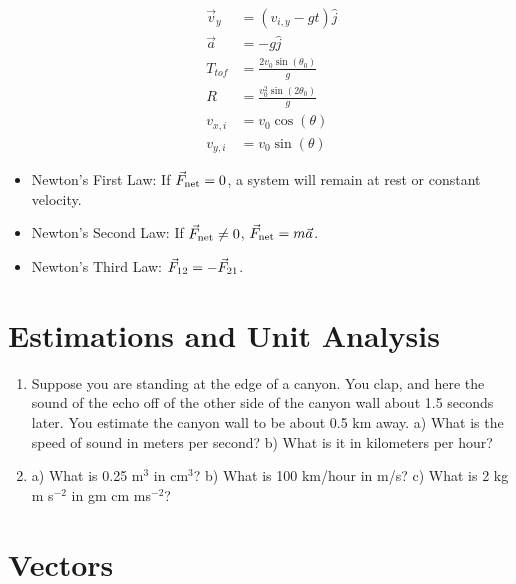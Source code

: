 \documentclass[10pt]{article}
\begin{document}
\begin{itemize}
\begin{align}
\vec{v}_y &= (v_{i,y} - g t) \hat{j} \\
\vec{a} &= -g \hat{j} \\
T_{tof} &= \frac{2 v_0\sin(\theta_0)}{g} \\
R &= \frac{v_0^2\sin(2\theta_0)}{g} \\
v_{x,i} &= v_0 \cos(\theta) \\
v_{y,i} &= v_0 \sin(\theta)
\end{align}
\item Newton's First Law: If $\vec{F}_{\rm net} = 0$, a system will remain at rest or constant velocity.
\item Newton's Second Law: If $\vec{F}_{\rm net} \neq 0$, $\vec{F}_{\rm net} = m\vec{a}$.
\item Newton's Third Law: $\vec{F}_{\rm 12} = - \vec{F}_{\rm 21}$.
\end{itemize}

\clearpage

\section{Estimations and Unit Analysis}

\begin{enumerate}
\item Suppose you are standing at the edge of a canyon.  You clap, and here the sound of the echo off of the other side of the canyon wall about 1.5 seconds later.  You estimate the canyon wall to be about 0.5 km away.  a) What is the speed of sound in meters per second?  b) What is it in kilometers per hour? \\ \vspace{1.5cm}
\item a) What is 0.25 m$^3$ in cm$^3$? b) What is 100 km/hour in m/s? c) What is 2 kg m s$^{-2}$ in gm cm ms$^{-2}$? \\ \vspace{1cm}
\end{enumerate}

\section{Vectors}
\end{document}
